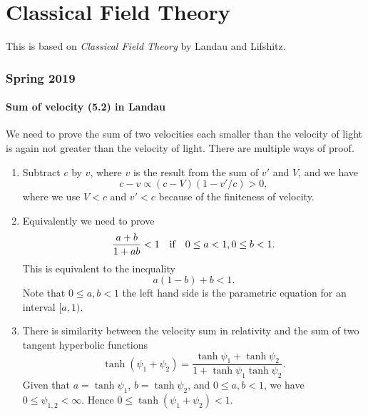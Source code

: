 \documentclass[10pt]{article}
\begin{document}
\part{Classical Field Theory}
This is based on \textit{Classical Field Theory} by Landau and Lifshitz.
\section{Spring 2019}

\subsection{Sum of velocity (5.2) in Landau}
We need to prove the sum of two velocities each smaller than the velocity of light is again not greater than the velocity of light. There are multiple ways of proof.
\begin{enumerate}
	\item Subtract $c$ by $v$, where $v$ is the result from the sum of $v'$ and $V$, and we have
	\begin{equation}
		c - v \propto (c-V)(1-v'/c) >0,
	\end{equation}
	where we use $V<c$ and $v'<c$ because of the finiteness of velocity.
	\item Equivalently we need to prove
	\begin{equation}
		\frac{a+b}{1+ab} <1\qif 0 \le a<1, 0 \le b<1.
	\end{equation}
	This is equivalent to the inequality
	\begin{equation}
		a(1-b) + b <1.
	\end{equation}
	Note that $0 \le a, b<1$ the left hand side is the parametric equation for an interval $[a,1)$.
	\item There is similarity between the velocity sum in relativity and the sum of two tangent hyperbolic functions
	\begin{equation}
		\tanh{(\psi_1 + \psi_2)} = \frac{\tanh{\psi_1} + \tanh{\psi_2}}{1 + \tanh{\psi_1} \tanh{\psi_2}}.
	\end{equation}
	Given that $a = \tanh{\psi_1}$, $b = \tanh{\psi_2}$, and $0 \le a,b <1$, we have $0 \le \psi_{1,2} < \infty$. Hence $0 \le \tanh{(\psi_1 + \psi_2)} <1$.


\end{enumerate}
\end{document}
